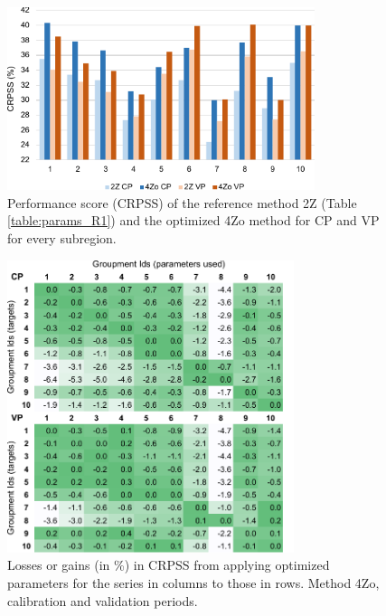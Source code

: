 \documentclass[review]{elsarticle}
\begin{document}
\begin{figure}[t]
	\centerline{\includegraphics[width=9cm]{figures/fig04.pdf}}
	\caption{Performance score (CRPSS) of the reference method 2Z (Table \ref{table:params_R1}) and the optimized 4Zo method for CP and VP for every subregion.}
	\label{fig:figure_crpss_4Zo}
\end{figure}

\begin{figure}[t]
	\centerline{\includegraphics[width=8.4cm]{figures/fig05.pdf}}
	\caption{Losses or gains (in \%) in CRPSS from applying optimized parameters for the series in columns to those in rows. Method 4Zo, calibration and validation periods.}
	\label{fig:crossing_4Zo}
\end{figure}
\end{document}
